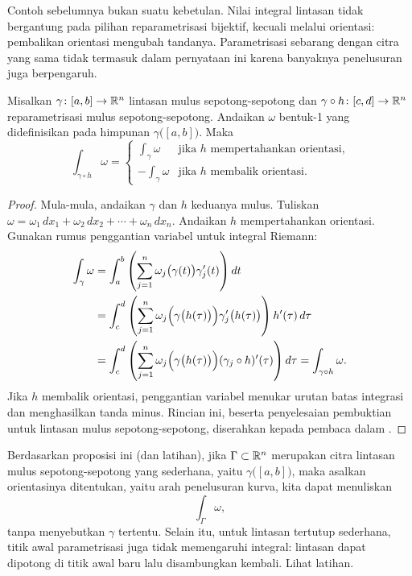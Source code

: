 Contoh sebelumnya bukan suatu kebetulan.
Nilai integral lintasan tidak bergantung pada pilihan reparametrisasi bijektif,
kecuali melalui orientasi: pembalikan orientasi mengubah tandanya.  Parametrisasi
sebarang dengan citra yang sama tidak termasuk dalam pernyataan ini karena banyaknya penelusuran juga berpengaruh.

\begin{prop} \label{mv:prop:pathintrepararam}
Misalkan $\gamma \colon [a,b] \to {\mathbb{R}}^n$ lintasan mulus sepotong-sepotong dan
$\gamma \circ h \colon [c,d] \to {\mathbb{R}}^n$ reparametrisasi mulus sepotong-sepotong.
Andaikan $\omega$ bentuk-1 yang didefinisikan pada himpunan $\gamma\bigl([a,b]\bigr)$.  Maka
\begin{equation*}
\int_{\gamma \circ h} \omega =
\begin{cases}
\int_{\gamma} \omega  & \text{jika } h \text{ mempertahankan orientasi,}\\
-\int_{\gamma} \omega & \text{jika } h \text{ membalik orientasi.}
\end{cases}
\end{equation*}
\end{prop}

\begin{proof}
Mula-mula, andaikan $\gamma$ dan $h$ keduanya mulus.
Tuliskan $\omega = \omega_1 \, dx_1 + \omega_2 \, dx_2 + \cdots +
\omega_n \, dx_n$.
Andaikan $h$ mempertahankan orientasi.  Gunakan
rumus penggantian variabel untuk integral Riemann:
\begin{equation*}
\begin{split}
\int_{\gamma} \omega
& =
\int_a^b 
\left(
\sum_{j=1}^n
\omega_j\bigl(\gamma(t)\bigr) \gamma_j'(t)
\right) dt
\\
& =
\int_c^d 
\left(
\sum_{j=1}^n
\omega_j\Bigl(\gamma\bigl(h(\tau)\bigr)\Bigr) \gamma_j'\bigl(h(\tau)\bigr)
\right) h'(\tau) \, d\tau
\\
& =
\int_c^d 
\left(
\sum_{j=1}^n
\omega_j\Bigl(\gamma\bigl(h(\tau)\bigr)\Bigr) (\gamma_j \circ h)'(\tau)
\right) d\tau
=
\int_{\gamma \circ h} \omega .
\end{split}
\end{equation*}
Jika $h$ membalik orientasi, penggantian variabel menukar urutan batas integrasi
dan menghasilkan tanda minus.
Rincian ini, beserta penyelesaian pembuktian untuk lintasan mulus
sepotong-sepotong, diserahkan kepada pembaca dalam .
\end{proof}

Berdasarkan proposisi ini (dan latihan), jika $\Gamma
\subset {\mathbb{R}}^n$ merupakan citra lintasan mulus sepotong-sepotong yang sederhana,
yaitu $\gamma\bigl([a,b]\bigr)$, maka asalkan orientasinya ditentukan, yaitu arah
penelusuran kurva, kita dapat menuliskan
\begin{equation*}
\int_{\Gamma} \omega ,
\end{equation*}
tanpa menyebutkan $\gamma$ tertentu.
Selain itu, untuk lintasan tertutup sederhana, titik awal parametrisasi juga
tidak memengaruhi integral: lintasan dapat dipotong di titik awal baru lalu
disambungkan kembali.  Lihat latihan.

